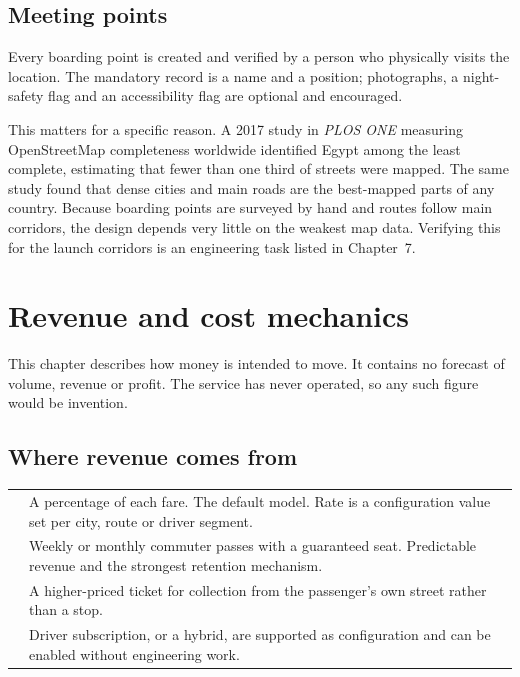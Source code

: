 \section{Meeting points}

Every boarding point is created and verified by a person who physically visits the location. The
mandatory record is a name and a position; photographs, a night-safety flag and an accessibility
flag are optional and encouraged.

This matters for a specific reason. A 2017 study in \emph{PLOS ONE} measuring OpenStreetMap
completeness worldwide identified Egypt among the least complete, estimating that fewer than one
third of streets were mapped. The same study found that dense cities and main roads are the
best-mapped parts of any country. Because boarding points are surveyed by hand and routes follow
main corridors, the design depends very little on the weakest map data. Verifying this for the
launch corridors is an engineering task listed in Chapter~7.

\chapter{Revenue and cost mechanics}

\begin{notebox}
This chapter describes how money is intended to move. It contains no forecast of volume, revenue or
profit. The service has never operated, so any such figure would be invention.
\end{notebox}

\section{Where revenue comes from}

\begin{center}
\begin{tabularx}{\textwidth}{@{}L{34mm}Y@{}}
\toprule
{} & A percentage of each fare. The default model. Rate is a configuration value set per city, route or driver segment. \\
 & Weekly or monthly commuter passes with a guaranteed seat. Predictable revenue and the strongest retention mechanism. \\
 & A higher-priced ticket for collection from the passenger's own street rather than a stop. \\
 & Driver subscription, or a hybrid, are supported as configuration and can be enabled without engineering work. \\
\bottomrule
\end{tabularx}
\end{center}

